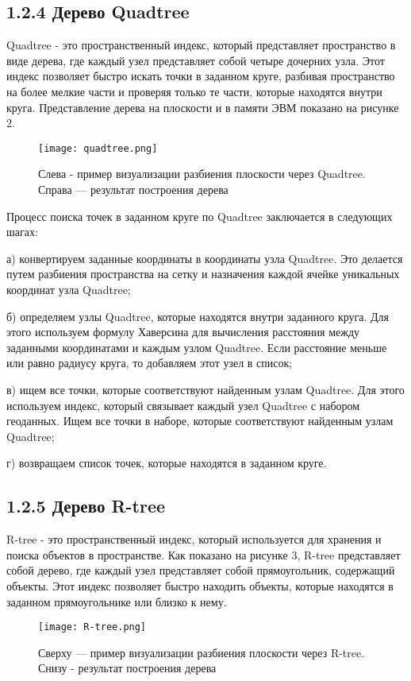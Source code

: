 \subsection{1.2.4 Дерево Quadtree}
Quadtree - это пространственный индекс, который представляет пространство в виде дерева, где каждый узел представляет собой четыре дочерних узла. Этот индекс позволяет быстро искать точки в заданном круге, разбивая пространство на более мелкие части и проверяя только те части, которые находятся внутри круга. Представление дерева на плоскости и в памяти ЭВМ показано на рисунке 2. 
\par\vspace{1em}
\begin{figure}[H]
    \centering
    \texttt{[image: quadtree.png]}
    \caption{Слева - пример визуализации разбиения плоскости через Quadtree. Справа — результат построения дерева}
\end{figure}
  
Процесс поиска точек в заданном круге по Quadtree заключается в следующих шагах:
\par а) конвертируем заданные координаты в координаты узла Quadtree. Это делается путем разбиения пространства на сетку и назначения каждой ячейке уникальных координат узла Quadtree;
\par б) определяем узлы Quadtree, которые находятся внутри заданного круга. Для этого используем формулу Хаверсина для вычисления расстояния между заданными координатами и каждым узлом Quadtree. Если расстояние меньше или равно радиусу круга, то добавляем этот узел в список;
\par в) ищем все точки, которые соответствуют найденным узлам Quadtree. Для этого используем индекс, который связывает каждый узел Quadtree с набором геоданных. Ищем все точки в наборе, которые соответствуют найденным узлам Quadtree;
\par г) возвращаем список точек, которые находятся в заданном круге.


\subsection{1.2.5 Дерево R-tree}
R-tree - это пространственный индекс, который используется для хранения и поиска объектов в пространстве\cite{guttmanRtree}. Как показано на рисунке 3, R-tree представляет собой дерево, где каждый узел представляет собой прямоугольник, содержащий объекты. Этот индекс позволяет быстро находить объекты, которые находятся в заданном прямоугольнике или близко к нему.
\par\vspace{1em}
\begin{figure}[H]
    \centering
    \texttt{[image: R-tree.png]}
    \caption{Сверху — пример визуализации разбиения плоскости через R-tree. Снизу - результат построения дерева}
\end{figure}
  
